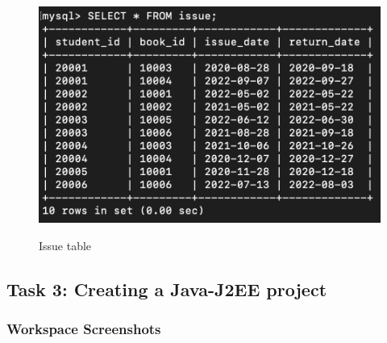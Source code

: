 \documentclass[12pt]{article}
\begin{document}
\begin{figure}[!hbt]
    \centering
    \includegraphics[scale=0.9]{screenshots/b2_04.png}
    \label{fig:my_label1}
    \caption{Issue table}
\end{figure}

\newpage


\subsection{Task 3: Creating a Java-J2EE project}

\subsubsection{Workspace Screenshots}
\end{document}
